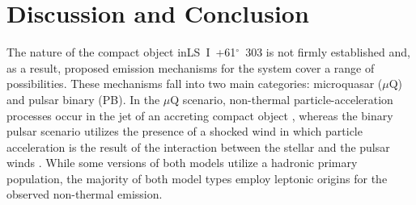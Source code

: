 \documentclass[preprint2]{aastex}
\newcommand{\lsi}{LS~I~+61$^{\circ}$~303}
\begin{document}
\section{Discussion and Conclusion}
The nature of the compact object in\linebreak \lsi{} is not firmly established and, as a result, proposed emission mechanisms for the system cover a range of possibilities. These mechanisms fall into two main categories: microquasar ($\mu$Q) and pulsar binary (PB). In the $\mu$Q scenario, non-thermal particle-acceleration processes occur in the jet of an accreting compact object \citep{Massi2001,Massi2013,2015A&A...575L...9M}, whereas the binary pulsar scenario utilizes the presence of a shocked wind in which particle acceleration is the result of the interaction between the stellar and the pulsar winds \citep{Dhawan2006}. While some versions of both models utilize a hadronic primary population, the  majority of both model types employ leptonic origins for the observed non-thermal emission.
\end{document}
